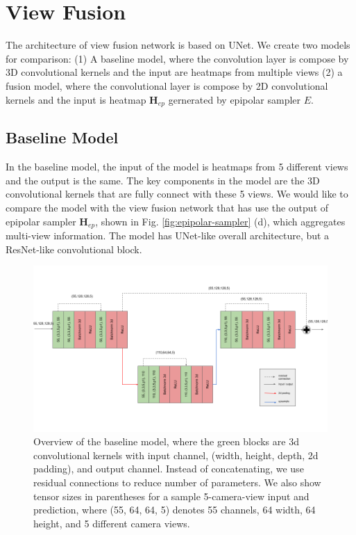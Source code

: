 \section{View Fusion}
The architecture of view fusion network is based on UNet. We create two models for comparison: (1) A baseline model, where the convolution layer is compose by 3D convolutional kernels and the input are heatmaps from multiple views (2) a fusion model, where the convolutional layer is compose by 2D convolutional kernels and the input is heatmap $\mathbf{H}_{ep}$ gernerated by epipolar sampler $\mathit{E}$. 
\subsection{Baseline Model}
In the baseline model, the input of the model is heatmaps from 5 different views and the output is the same. The key components in the model are the 3D convolutional kernels that are fully connect with these 5 views. We would like to compare the model with the view fusion network that has use the output of epipolar sampler $\mathbf{H}_{ep}$, shown in Fig. \ref{fig:epipolar-sampler} (d), which aggregates multi-view information. The model has UNet-like overall architecture, but a ResNet-like convolutional block.
\begin{figure}
	\centering
	\includegraphics[width=1.0\columnwidth]{figures/ch4/baseline.png}
	\caption{Overview of the baseline model, where the green blocks are 3d convolutional kernels with input channel, (width, height, depth, 2d padding), and output channel. Instead of concatenating, we use residual connections to reduce number of parameters. We also show tensor sizes in parentheses for a sample 5-camera-view input and prediction, where (55, 64, 64, 5) denotes 55 channels, 64 width, 64 height, and 5 different camera views.}
	\label{fig:view-baseline}
\end{figure}
